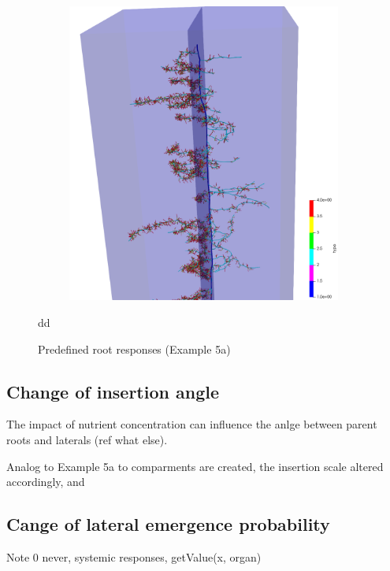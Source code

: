\begin{figure}
\begin{subfigure}[c]{0.3\textwidth}
 \label{fig:insertion}
\end{subfigure}
\begin{subfigure}[c]{0.3\textwidth}
\includegraphics[width=0.99\textwidth]{example5d.png}
 \label{fig:probability}
\end{subfigure}dd
\caption{Predefined root responses (Example 5a)}
\end{figure}


\subsection{Change of insertion angle} \label{sec:insertion_angle}

The impact of nutrient concentration can influence the anlge between parent roots and laterals (ref what else).

Analog to Example 5a to comparments are created, the insertion scale altered accordingly, and 



\subsection{Cange of lateral emergence probability} \label{sec:branching}



Note 0 never, systemic responses, getValue(x, organ) 


